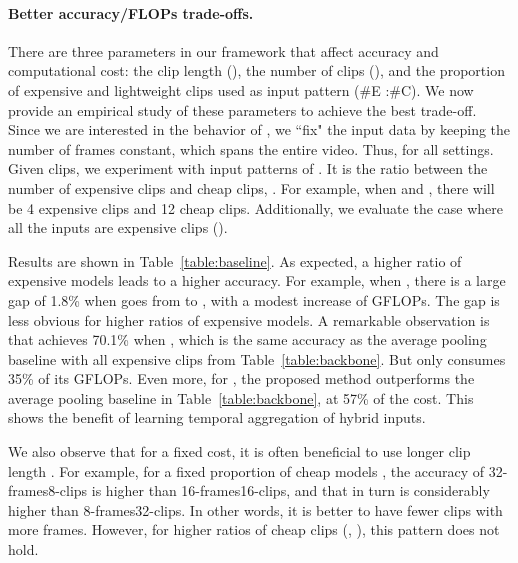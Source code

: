 \documentclass[10pt,twocolumn,letterpaper]{article}
\def\x{}
\begin{document}
{{\paragraph{Better accuracy/FLOPs trade-offs.}
\label{sec:mix_feature_combination}
There are three parameters in our framework that affect accuracy and computational cost:  the clip length (), the number of clips (), and the proportion of expensive and lightweight clips used as input pattern (\#E :\#C).  We now provide an empirical study of these parameters to achieve the best trade-off.  Since we are interested in the behavior of \oursfr, we ``fix" the input data by keeping the number of frames constant, which spans the entire video. Thus,  for all settings. Given  clips, we experiment with input patterns of . It is the ratio between the number of expensive clips and cheap clips, . For example, when  and , there will be 4 expensive clips and 12 cheap clips. Additionally, we evaluate the case where all the inputs are expensive clips ().

Results are shown in Table~\ref{table:baseline}. As expected, a higher ratio of expensive models leads to a higher accuracy. For example, when , there is a large gap of 1.8\% when  goes from  to , with a modest increase of  GFLOPs. The gap is less obvious for higher ratios of expensive models.  A remarkable observation is that \oursfr achieves 70.1\% when , which is the same accuracy as the average pooling baseline with all expensive clips from Table~\ref{table:backbone}. But \oursfr only consumes 35\% of its GFLOPs. Even more, for , the proposed method outperforms the average pooling baseline in Table~\ref{table:backbone}, at 57\% of the cost. This shows the benefit of learning temporal aggregation of hybrid inputs. 

We also observe that for a fixed cost, it is often beneficial to use longer clip length . For example, for a fixed proportion of cheap models , the accuracy of  32-frames8-clips is higher than 16-frames16-clips, and that in turn is considerably higher than 8-frames32-clips. In other words, it is better to have fewer clips with more frames. However, for higher ratios of cheap clips (\eg, ), this pattern does not hold.


\begin{table}[t]
\centering
{}
\caption{{\bf Comparisons of runtime between different methods.} The results of \oursfr is reported in the 32-frames\x 8-clips setting.}
\label{tab:comp_runtime}
\end{table}


}}
\end{document}
